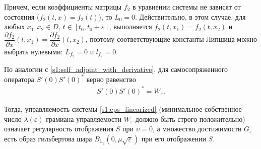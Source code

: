 \documentclass[../main.tex]{subfiles}
\begin{document}
 Причем, если коэффициенты матрицы $f_2$ в уравнении системы не зависят от состояния ($f_2(t,x) = f_2(t)$), то $L_0 = 0$. 
Действительно, в этом случае, для любых $x_1, x_2 \in D$, $t\in [t_0, t_0 + \overline{\varepsilon}]$, выполняется $f_2(t,x_1) = f_2(t, x_2)$ и $\dfrac{\partial f_2}{\partial x} (t, x_1) = \dfrac{\partial f_2}{\partial x} (t, x_2)$, поэтому соответствующие константы Липшица можно выбрать нулевыми: $ L_{f_2} = 0$ и $l_{f_2} = 0$.
 
По аналогии с \eqref{s1:self_adjoint_with_derivative}, для самосопряженного оператора $S'(0)S'(0)^*$ верно равенство 
\begin{gather*}
	S'(0)S'(0)^* = W_{\varepsilon}. 
\end{gather*}
 
Тогда, управляемость системы \eqref{s1:eps_linearized} (минимальное собственное число $ \lambda(\varepsilon) $ грамиана управляемости $W_{\varepsilon}$ должно быть строго положительно) означает регулярность отображения $S$ при $\upsilon = 0$, а множество достижимости $G_{\varepsilon}$ есть образ гильбертова шара $B_{\mathbb{L}_2}(0,\mu\sqrt{\varepsilon})$ при его отображении $S$.
 
\end{document}
